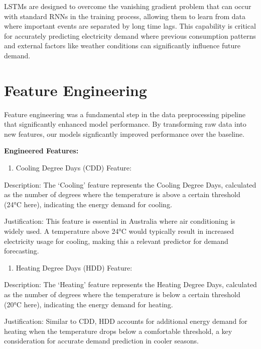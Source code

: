 \documentclass[
]{article}
\providecommand{\tightlist}{%
  \setlength{\itemsep}{0pt}\setlength{\parskip}{0pt}}
\begin{document}
LSTMs are designed to overcome the vanishing gradient problem that can
occur with standard RNNs in the training process, allowing them to learn
from data where important events are separated by long time lags. This
capability is critical for accurately predicting electricity demand
where previous consumption patterns and external factors like weather
conditions can significantly influence future demand.

\section{Feature Engineering}\label{feature-engineering}

Feature engineering was a fundamental step in the data preprocessing
pipeline that significantly enhanced model performance. By transforming
raw data into new features, our models signficantly improved performance
over the baseline.

\textbf{Engineered Features:}

\begin{enumerate}
\def\labelenumi{\arabic{enumi}.}
\tightlist
\item
  Cooling Degree Days (CDD) Feature:
\end{enumerate}

Description: The `Cooling' feature represents the Cooling Degree Days,
calculated as the number of degrees where the temperature is above a
certain threshold (24°C here), indicating the energy demand for cooling.

Justification: This feature is essential in Australia where air
conditioning is widely used. A temperature above 24°C would typically
result in increased electricity usage for cooling, making this a
relevant predictor for demand forecasting.

\begin{enumerate}
\def\labelenumi{\arabic{enumi}.}
\setcounter{enumi}{1}
\tightlist
\item
  Heating Degree Days (HDD) Feature:
\end{enumerate}

Description: The `Heating' feature represents the Heating Degree Days,
calculated as the number of degrees where the temperature is below a
certain threshold (20°C here), indicating the energy demand for heating.

Justification: Similar to CDD, HDD accounts for additional energy demand
for heating when the temperature drops below a comfortable threshold, a
key consideration for accurate demand prediction in cooler seasons.
\end{document}
